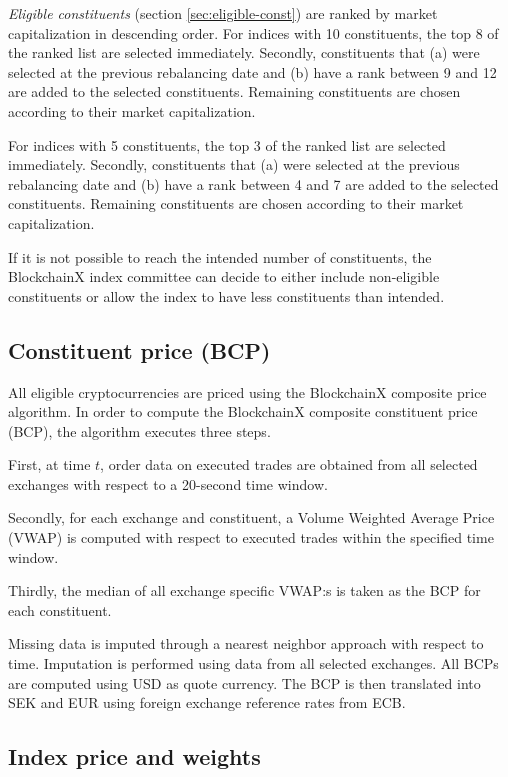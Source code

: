 \documentclass{article}
\begin{document}
\textit{Eligible constituents} (section \ref{sec:eligible-const}) are ranked by market capitalization in descending order. 
For indices with 10 constituents, the top 8 of the ranked list are selected immediately.
Secondly, constituents that (a) were selected at the previous rebalancing date and (b) have a rank between 9 and 12 are added to the selected constituents. Remaining constituents are chosen according to their market capitalization. 

For indices with 5 constituents, the top 3 of the ranked list are selected immediately.
Secondly, constituents that (a) were selected at the previous rebalancing date and (b) have a rank between 4 and 7 are added to the selected constituents. Remaining constituents are chosen according to their market capitalization.

If it is not possible to reach the intended number of constituents, the BlockchainX index committee can decide to either include non-eligible constituents or allow the index to have less constituents than intended.

\subsection{Constituent price (BCP)}\label{sec:BCP}
All eligible %
cryptocurrencies are priced using the BlockchainX composite price algorithm. In order to compute the BlockchainX composite constituent price (BCP), the algorithm executes three steps.

First, at time $t$, order data on executed trades are obtained from all selected exchanges with respect to a 20-second time window.

Secondly, for each exchange and constituent, a Volume Weighted Average Price (VWAP) is computed with respect to executed trades within the specified time window. 

Thirdly, the median of all exchange specific VWAP:s is taken as the BCP for each constituent. 

Missing data is imputed through a nearest neighbor approach with respect to time. Imputation is performed using data from all selected exchanges. All BCPs are computed using USD as quote currency. The BCP is then translated into SEK and EUR using foreign exchange reference rates from ECB.

\subsection{Index price and weights}
\end{document}
